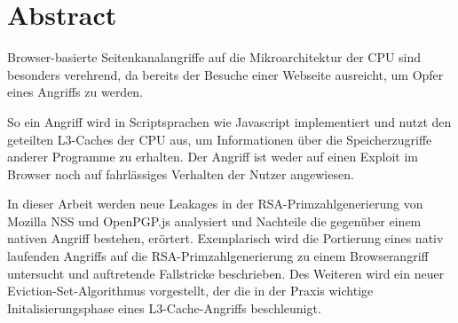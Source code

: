 \chapter*{Abstract}
Browser-basierte Seitenkanalangriffe auf die Mikroarchitektur der CPU sind besonders verehrend, da bereits der Besuche einer Webseite ausreicht, um Opfer eines Angriffs zu werden.

So ein Angriff wird in Scriptsprachen wie Javascript implementiert und nutzt den geteilten L3-Caches der CPU aus, um Informationen über die Speicherzugriffe anderer Programme zu erhalten.
Der Angriff ist weder auf einen Exploit im Browser noch auf fahrlässiges Verhalten der Nutzer angewiesen.



In dieser Arbeit  werden neue Leakages in der RSA-Primzahlgenerierung von Mozilla NSS und OpenPGP.js analysiert und Nachteile die gegenüber einem nativen Angriff bestehen, erörtert.
Exemplarisch wird die Portierung eines nativ laufenden Angriffs auf die RSA-Primzahlgenerierung zu einem Browserangriff 
untersucht und auftretende Fallstricke beschrieben.
Des Weiteren wird ein neuer  Eviction-Set-Algorithmus vorgestellt, der die in der Praxis wichtige Initalisierungsphase eines L3-Cache-Angriffs beschleunigt. 